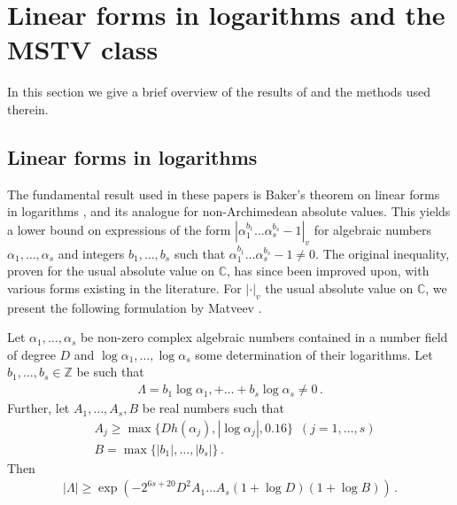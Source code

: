 \documentclass{theoretics}
\newcommand{\Z}{\mathbb{Z}}
\begin{document}
\section{Linear forms in logarithms and the MSTV class} 
In this section we give a brief overview of the results of \cite{Mignotte_distance,Vereshchagin} and the methods used therein. 
\subsection{Linear forms in logarithms}
The fundamental result used in these papers is Baker's theorem on linear forms in logarithms \cite{Baker_Sharpening_II_1973}, and its analogue for non-Archimedean absolute values. This yields a lower bound on expressions of the form $|\alpha_1^{b_1} \dots \alpha_s^{b_s}-1|_v$ for algebraic numbers $\alpha_1, \dots , \alpha_s$ and integers $b_1, \dots , b_s$ such that $\alpha_1^{b_1} \dots  \alpha_s^{b_s} - 1 \neq 0$. The original inequality, proven for the usual absolute value on $\mathbb C$, has since been improved upon, with various forms existing in the literature. For $|\cdot|_v$ the usual absolute value on $\mathbb C$, we present the following formulation by Matveev \cite[Corollary 2.3]{matveev_explicit_2000}.
\begin{theorem}[Matveev]\label{Matveev} Let $\alpha_1, \dots , \alpha_s$ be non-zero complex algebraic numbers contained in a number field of degree $D$ and $\log \alpha_1, \dots , \log \alpha_s$ some determination of their logarithms. Let $b_1, \dots , b_s \in \Z$ be such that 
\begin{align*}
    \Lambda = b_1 \log \alpha_1, + \dots + b_s \log \alpha_s \neq 0 \, .
\end{align*}
Further, let $A_1, \dots , A_s, B$ be real numbers such that 
\begin{align*}
    &A_j \geq \max\{Dh(\alpha_j), |\log \alpha_j|, 0.16\} \, \, \, (j = 1, \dots , s) \\
    &B = \max\{|b_1|, \dots , |b_s|\} \, .
\end{align*}
Then 
\begin{align*}
    |\Lambda| \geq \exp\left(-2^{6s+20}D^2 A_1 \dots A_s (1+ \log D)(1+ \log B)\right) \, .
\end{align*}
\end{theorem}
\end{document}
